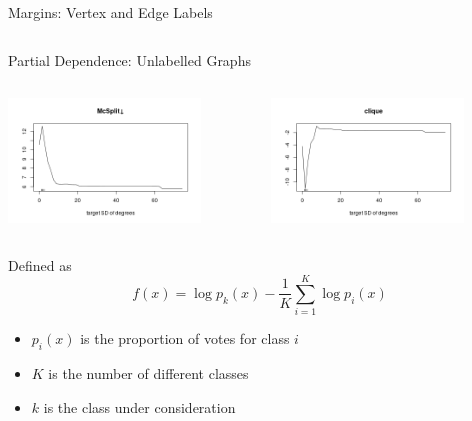 \documentclass{beamer}
\begin{document}
\begin{frame}{Margins: Vertex and Edge Labels}
\begin{columns}[t]
\begin{column}{0.5\textwidth}
    \end{column}
  \end{columns}
\end{frame}

\begin{frame}{Partial Dependence: Unlabelled Graphs}
  \begin{columns}
    \begin{column}{0.5\textwidth}
      \centering
      \includegraphics[width=0.8\textwidth,height=0.8\textheight,keepaspectratio]{../dissertation/images/mcsplit_partial.png}
    \end{column}
    \begin{column}{0.5\textwidth}
      \centering
      \includegraphics[width=0.8\textwidth,height=0.8\textheight,keepaspectratio]{../dissertation/images/clique_partial.png}
    \end{column}
  \end{columns}
  \begin{block}{Defined as}
    \[ f(x) = \log{p_k(x)} - \frac{1}{K} \sum_{i=1}^K \log{p_i(x)} \]
    \begin{itemize}
    \item $p_i(x)$ is the proportion of votes for class $i$
    \item $K$ is the number of different classes
    \item $k$ is the class under consideration
    \end{itemize}
  \end{block}
\end{frame}
\end{document}
